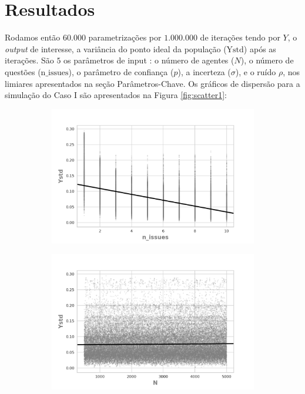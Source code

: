 \section{Resultados}

Rodamos então \(60.000\) parametrizações por \(1.000.000\) de iterações tendo
por \(Y\), o \textit{output} de interesse, a variância do ponto ideal da
população (\(\text{Ystd}\)) após as iterações. São \(5\) os parâmetros de input
: o número de agentes (\(N\)), o número de questões (\(\text{n\_issues}\)), o
parâmetro de confiança (\(p\)), a incerteza (\(\sigma\)), e o ruído \(\rho\), nos
limiares apresentados na seção Parâmetros-Chave. Os gráficos de dispersão para a
simulação do Caso I são apresentados na Figura \ref{fig:scatter1}:

\begin{figure}[H]
    \centering
    \begin{subfigure}[b]{0.49\textwidth}
        \includegraphics[width=\textwidth]{ims/mutoregressions/regressionmutatingon_issues.png}
    \end{subfigure}
    \begin{subfigure}[b]{0.49\textwidth}
        \includegraphics[width=\textwidth]{ims/mutoregressions/regressionmutatingoN.png}
    \end{subfigure}


\end{figure}

